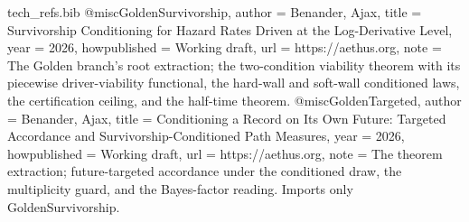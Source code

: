 \begin{filecontents}[overwrite]{tech_refs.bib}
@misc{GoldenSurvivorship,
  author       = {Benander, Ajax},
  title        = {Survivorship Conditioning for Hazard Rates Driven at the Log-Derivative Level},
  year         = {2026},
  howpublished = {Working draft},
  url          = {https://aethus.org},
  note         = {The Golden branch's root extraction; the two-condition viability
                  theorem with its piecewise driver-viability functional, the
                  hard-wall and soft-wall conditioned laws, the certification
                  ceiling, and the half-time theorem.}
}
@misc{GoldenTargeted,
  author       = {Benander, Ajax},
  title        = {Conditioning a Record on Its Own Future: Targeted Accordance and Survivorship-Conditioned Path Measures},
  year         = {2026},
  howpublished = {Working draft},
  url          = {https://aethus.org},
  note         = {The theorem extraction; future-targeted accordance under the
                  conditioned draw, the multiplicity guard, and the Bayes-factor
                  reading. Imports only GoldenSurvivorship.}
}


\end{filecontents}
